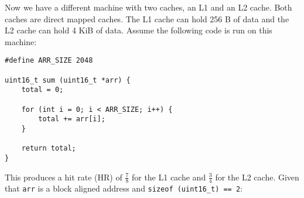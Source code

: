 \begin{blocksection}
\question
Now we have a different machine with two caches, an L1 and an L2 cache. Both caches are direct mapped caches. The L1 cache can hold 256 B of data and the L2 cache can hold 4 KiB of data. Assume the following code is run on this machine:

\begin{verbatim}				
#define ARR_SIZE 2048
					
uint16_t sum (uint16_t *arr) {
    total = 0;
					
    for (int i = 0; i < ARR_SIZE; i++) {
        total += arr[i];					
    }

    return total;
}
\end{verbatim}
						
This produces a hit rate (HR) of $\frac{7}{8}$ for the L1 cache and $\frac{3}{4}$ for the L2 cache. Given that ​\lstinline$arr$​ is a block aligned address and ​\lstinline$sizeof (uint16_t) == 2​$:

\end{blocksection}
